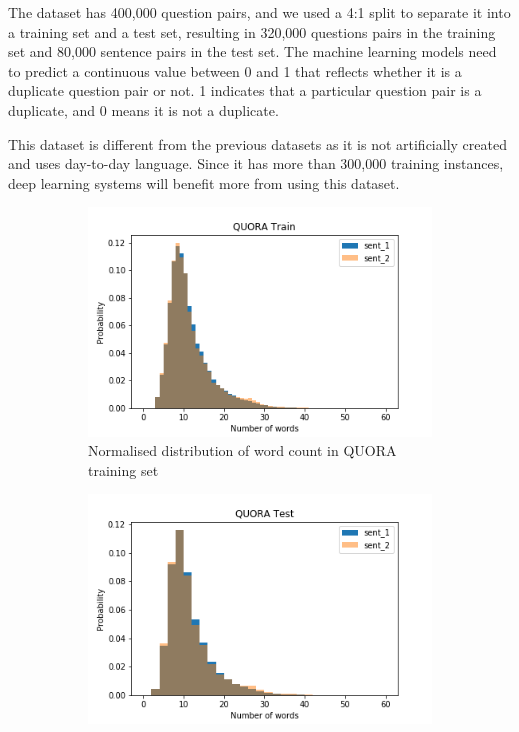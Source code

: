 \begin{enumerate}
The dataset has 400,000 question pairs, and we used a 4:1 split to separate it into a training set and a test set, resulting in 320,000 questions pairs in the training set and  80,000 sentence pairs in the test set. The machine learning models need to predict a continuous value between 0 and 1 that reflects whether it is a duplicate question pair or not. 1 indicates that a particular question pair is a duplicate, and 0 means it is not a duplicate. 


This dataset is different from the previous datasets as it is not artificially created and uses day-to-day language. Since it has more than 300,000 training instances, deep learning systems will benefit more from using this dataset. 


\begin{figure}
	\captionsetup[subfigure]{justification=centering}
	\centering
	\begin{subfigure}[b]{.5\textwidth}
		\centering
		\includegraphics[width=\textwidth]{figures/semantic_textual_similarity/introduction/quora_train_words.png}
		\caption{Normalised distribution of word count in QUORA training set}
		\label{fig:quora_train_words}
	\end{subfigure}%
	\begin{subfigure}[b]{.5\textwidth}
		\centering
		\includegraphics[width=\textwidth]{figures/semantic_textual_similarity/introduction/quora_test_words.png}

\end{subfigure}
\end{figure}
\end{enumerate}
